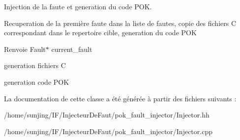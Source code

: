 Injection de la faute et generation du code POK. 

Recuperation de la première faute dans la liste de fautes, copie des fichiers C correspondant dans le repertoire cible, generation du code POK

\begin{DoxyReturn}{Renvoie}
Fault$\ast$ current\_\-fault 
\end{DoxyReturn}


generation fichiers C

generation code POK 



La documentation de cette classe a été générée à partir des fichiers suivants :\begin{DoxyCompactItemize}
\item 
/home/sunjing/IF/InjecteurDeFaut/pok\_\-fault\_\-injector/Injector.hh\item 
/home/sunjing/IF/InjecteurDeFaut/pok\_\-fault\_\-injector/Injector.cpp\end{DoxyCompactItemize}
